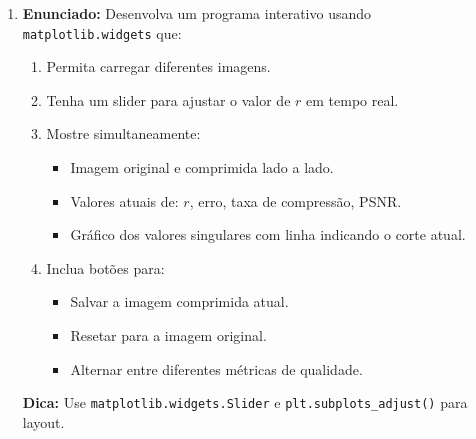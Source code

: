 \documentclass[a4paper,12pt]{article}
\begin{document}
\begin{enumerate}
    \item \textbf{Enunciado:}
    Desenvolva um programa interativo usando \texttt{matplotlib.widgets} que:
    \begin{enumerate}
        \item Permita carregar diferentes imagens.
        \item Tenha um slider para ajustar o valor de $r$ em tempo real.
        \item Mostre simultaneamente:
        \begin{itemize}
            \item Imagem original e comprimida lado a lado.
            \item Valores atuais de: $r$, erro, taxa de compressão, PSNR.
            \item Gráfico dos valores singulares com linha indicando o corte atual.
        \end{itemize}
        \item Inclua botões para:
        \begin{itemize}
            \item Salvar a imagem comprimida atual.
            \item Resetar para a imagem original.
            \item Alternar entre diferentes métricas de qualidade.
        \end{itemize}
    \end{enumerate}
    \textbf{Dica:} Use \texttt{matplotlib.widgets.Slider} e \texttt{plt.subplots\_adjust()} para layout.


\end{enumerate}
\end{document}
